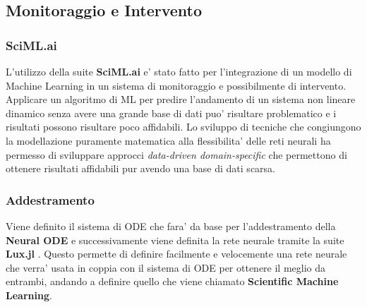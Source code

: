 \subsection{Monitoraggio e Intervento}

\subsubsection{SciML.ai}

L'utilizzo della suite \textbf{SciML.ai} e' stato fatto per l'integrazione
di un modello di Machine Learning in un sistema di monitoraggio e possibilmente di 
intervento. Applicare un algoritmo di ML per predire l'andamento di un sistema non lineare dinamico 
senza avere una grande base di dati puo' risultare problematico e i risultati possono risultare 
poco affidabili. Lo sviluppo di tecniche che congiungono la modellazione puramente matematica
alla flessibilita' delle reti neurali ha permesso di sviluppare approcci \emph{data-driven domain-specific} 
\cite{rackauckas2020universal} \cite{Kim_2021} \cite{dandekar2022bayesian} \cite{chen2019neural}
che permettono di ottenere risultati affidabili pur avendo una base di dati scarsa.

\subsubsection*{Addestramento}
Viene definito il sistema di ODE che fara' da base per l'addestramento della \textbf{Neural ODE} \cite{chen2019neural}
e successivamente viene definita la rete neurale tramite la suite \textbf{Lux.jl} \cite{pal2023lux}.
Questo permette di definire facilmente e velocemente una rete neurale che verra' usata 
in coppia con il sistema di ODE per ottenere il meglio da entrambi, andando a definire 
quello che viene chiamato \textbf{Scientific Machine Learning}.

